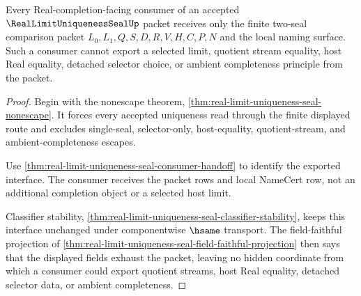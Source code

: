 \begin{theorem}
\label{thm:real-limit-uniqueness-seal-completion-consumer-totality}
Every Real-completion-facing consumer of an accepted $\RealLimitUniquenessSealUp$ packet receives only the finite two-seal comparison packet $L_0,L_1,Q,S,D,R,V,H,C,P,N$ and the local naming surface. Such a consumer cannot export a selected limit, quotient stream equality, host Real equality, detached selector choice, or ambient completeness principle from the packet.
\end{theorem}
\begin{proof}
Begin with the nonescape theorem, \autoref{thm:real-limit-uniqueness-seal-nonescape}. It forces every accepted uniqueness read through the finite displayed route and excludes single-seal, selector-only, host-equality, quotient-stream, and ambient-completeness escapes.

Use \autoref{thm:real-limit-uniqueness-seal-consumer-handoff} to identify the exported interface. The consumer receives the packet rows and local NameCert row, not an additional completion object or a selected host limit.

Classifier stability, \autoref{thm:real-limit-uniqueness-seal-classifier-stability}, keeps this interface unchanged under componentwise $\hsame$ transport. The field-faithful projection of \autoref{thm:real-limit-uniqueness-seal-field-faithful-projection} then says that the displayed fields exhaust the packet, leaving no hidden coordinate from which a consumer could export quotient streams, host Real equality, detached selector data, or ambient completeness.
\end{proof}

